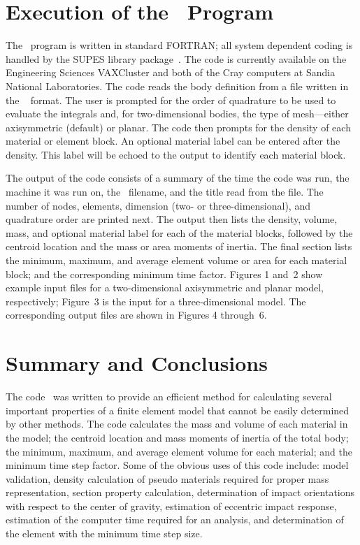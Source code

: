\chapter{Execution of the \NUM\ Program} The \NUM\ program is written
in standard FORTRAN; all system dependent coding is handled by the
SUPES library package~\cite{supes}.  The code is currently available
on the Engineering Sciences VAXCluster and both of the Cray computers
at Sandia National Laboratories.  The code reads the body definition
from a file written in the \EXO~\cite{EXODUS} format. The user is
prompted for the order of quadrature to be used to evaluate the
integrals and, for two-dimensional bodies, the type of mesh---either
axisymmetric (default) or planar.  The code then prompts for the
density of each material or element block. An optional material label
can be entered after the density. This label will be echoed to the
output to identify each material block.

The output of the code consists of a summary of the time the code was
run, the machine it was run on, the \EXO\ filename, and the title read
from the file. The number of nodes, elements, dimension (two- or
three-dimensional), and quadrature order are printed next. The output
then lists the density, volume, mass, and optional material label for
each of the material blocks, followed by the centroid location and the
mass or area moments of inertia.  The final section lists the minimum,
maximum, and average element volume or area for each material block;
and the corresponding minimum time factor. Figures 1 and~2 show
example input files for a two-dimensional axisymmetric and planar
model, respectively; Figure~3 is the input for a three-dimensional
model.  The corresponding output files are shown in Figures 4
through~6.

%
%

\chapter{Summary and Conclusions} The code \NUM\ was written to
provide an efficient method for calculating several important
properties of a finite element model that cannot be easily determined
by other methods.  The code calculates the mass and volume of each
material in the model; the centroid location and mass moments of
inertia of the total body; the minimum, maximum, and average element
volume for each material; and the minimum time step factor. Some of
the obvious uses of this code include: model validation, density
calculation of pseudo materials required for proper mass
representation, section property calculation, determination of impact
orientations with respect to the center of gravity, estimation of
eccentric impact response, estimation of the computer time
required for an analysis, and determination of the element with the
minimum time step size.

